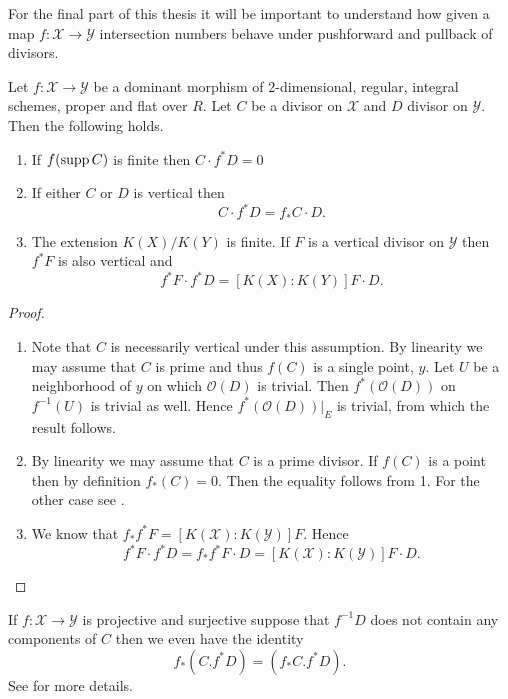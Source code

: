 For the final part of this thesis it will be important to understand how given a map $f: \mathscr X \to \mathscr Y$ intersection numbers behave under pushforward and pullback of divisors. 

\begin{theorem}
	Let $f:\mathscr X \to \mathscr Y$ be a dominant morphism of 2-dimensional, regular, integral schemes, proper and flat over $R$. 
	Let $C$ be a divisor on $\mathscr X$ and $D$ divisor on $\mathscr Y$. 
	Then the following holds.
	\begin{enumerate}
		\item If $f(\operatorname{supp} C)$ is finite then $C\cdot f^* D = 0$ 
		\item If either $C$ or $D$ is vertical then \begin{equation}\label{eq:projection_formula}
				C\cdot f^* D = f_* C \cdot D
			.\end{equation}
		\item The extension $K(X) / K(Y)$ is finite. 
			If $F$ is a vertical divisor on $\mathscr Y$ then $f^* F$ is also vertical and \[
				f^* F \cdot f^* D = [K(X): K(Y)] F \cdot D
			.\] 
	\end{enumerate}
\end{theorem}
\begin{proof}
	\begin{enumerate}
		\item Note that $C$ is necessarily vertical under this assumption. 
			By linearity we may assume that $C$ is prime and thus $f(C)$ is a single point, $y$. 
			Let $U$ be a neighborhood of  $y$ on which $\mathcal{O}(D)$ is trivial. 
			Then $f^*(\mathcal{O}(D))$ on $f^{-1}(U)$ is trivial as well. 
			Hence $f^*(\mathcal{O}(D))|_E$ is trivial, from which the result follows.
		\item By linearity we may assume that $C$ is a prime divisor.
			If $f(C)$ is a point then by definition $f_*(C) = 0$. Then the equality follows from 1. 
			For the other case see \cite[thm.\ 9.2.12]{liuAlgebraicGeometryArithmetic2002}. 
		\item 
			We know that $f_* f^* F = [K(\mathscr X): K(\mathscr Y)] F$. Hence  \[
				f^* F \cdot  f^* D = f_* f^* F \cdot D = [K(\mathscr X) : K(\mathscr Y)] F \cdot  D
			.\] 

	\end{enumerate}
\end{proof}

\begin{remark}
	If $f: \mathscr X \to \mathscr Y$ is projective and surjective suppose that $f^{-1}D$ does not contain any components of $C$ then we even have the identity  \[
		f_*(C . f^*D) = (f_*C . f^* D)
	.\] 
	See \cite[rem.\ 9.2.13]{liuAlgebraicGeometryArithmetic2002} for more details. 
\end{remark}
